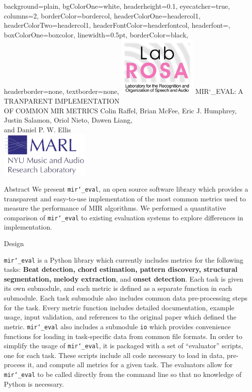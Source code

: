 \documentclass[paperwidth=120cm,paperheight=150cm,portrait,fontscale=.22,margin=5cm,lmargin=.2cm,rmargin=.2cm]{baposter}
\def\mireval{\texttt{mir\char`_eval}}
\begin{document}
\begin{poster}{
  background=plain,
  bgColorOne=white,
  headerheight=0.1\textheight,
  eyecatcher=true,
  columns=2,
  borderColor=bordercol,
  headerColorOne=headercol1,
  headerColorTwo=headercol1,
  headerFontColor=headerfontcol,
  headerfont=\textmd,
  boxColorOne=boxcolor,
  linewidth=0.5pt,
  borderColor=black,
  headerborder=none,
  textborder=none,
}
{\includegraphics[height=8em]{labrosa-new-nobg.pdf}}
{\textmd{MIR\char`_EVAL:$\;$A$\;$TRANPARENT$\;$IMPLEMENTATION\\OF$\;$COMMON$\;$MIR$\;$METRICS}}
{Colin Raffel, Brian McFee, Eric J. Humphrey, Justin Salamon, Oriol Nieto, Dawen Liang,\\[.2em] and Daniel P. W. Ellis\\[.2em]}
{\includegraphics[height=6em]{marl-logo.pdf}}

\begin{posterbox}[name=abstract,column=0]{Abstract}
We present \mireval{}, an open source software library which provides a transparent and easy-to-use implementation of the most common metrics used to measure the performance of MIR algorithms.
We performed a quantitative comparison of \mireval{} to existing evaluation systems to explore differences in implementation.
\end{posterbox}

\begin{posterbox}[name=design,column=0,below=abstract]{Design}

\mireval{} is a Python library which currently includes metrics for the following tasks: \textbf{Beat detection, chord estimation, pattern discovery, structural segmentation, melody extraction}, and \textbf{onset detection}.
Each task is given its own submodule, and each metric is defined as a separate function in each submodule.
Each task submodule also includes common data pre-processing steps for the task.
Every metric function includes detailed documentation, example usage, input validation, and references to the original paper which defined the metric.
\mireval{} also includes a submodule \texttt{io} which provides convenience functions for loading in task-specific data from common file formats.
In order to simplify the usage of \mireval{}, it is packaged with a set of ``evaluator'' scripts, one for each task.
These scripts include all code necessary to load in data, pre-process it, and compute all metrics for a given task.
The evaluators allow for \mireval{} to be called directly from the command line so that no knowledge of Python is necessary.


\end{posterbox}
\end{poster}
\end{document}
